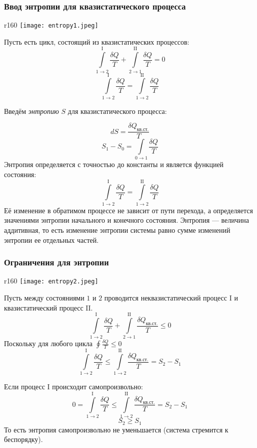 \documentclass[12pt, a4paper]{article}%
\begin{document}
\subsubsection*{Ввод энтропии для квазистатического процесса}


\begin{wrapfigure}[8]{r}{160}
\texttt{[image: entropy1.jpeg]}
\centering
\end{wrapfigure}

Пусть есть цикл, состоящий из квазистатических процессов:
\[\int\limits_{1\rightarrow2}^{\mathrm{I}}\frac{\delta Q}{T}+\int\limits_{2\rightarrow1}^{\mathrm{II}}\frac{\delta Q}{T}=0\]\[
\int\limits_{1\rightarrow2}^{\mathrm{I}}\frac{\delta Q}{T}=\int\limits_{1\rightarrow2}^{\mathrm{II}}\frac{\delta Q}{T}\]


Введём \textit{энтропию} $S$ для квазистатического процесса:



\[dS=\frac{\delta Q_{\text{кв.ст.}}}{T}\]\[ S_1-S_0=\int\limits_{0 \rightarrow 1}\frac{\delta Q}{T}\]Энтропия определяется с точностью до константы и является функцией состояния:
\[\int\limits_{1\rightarrow2}^{\mathrm{I}}\frac{\delta Q}{T}=\int\limits_{1\rightarrow2}^{\mathrm{II}}\frac{\delta Q}{T}\]Её изменение в обратимом процессе не зависит от пути перехода, а определяется значениями энтропии начального и конечного состояния.
Энтропия --- величина аддитивная, то есть изменение энтропии системы равно сумме изменений энтропии ее отдельных частей.

\subsubsection*{Ограничения для энтропии}

\begin{wrapfigure}[8]{r}{160}
\texttt{[image: entropy2.jpeg]}
\centering
\end{wrapfigure}



Пусть между состояниями $1$ и $2$ проводится неквазистатический процесс $\mathrm{I}$ и квазистатический процесс $\mathrm{II}$.
\[\int\limits_{1\rightarrow2}^{\mathrm{I}}\frac{\delta Q}{T}+\int\limits_{2\rightarrow1}^{\mathrm{II}}\frac{\delta Q_{\text{кв.ст.}}}{T}\le0\]Поскольку для любого цикла $\oint\frac{\delta Q}{T}\le0$
\[\int\limits_{1\rightarrow2}^{\mathrm{I}}\frac{\delta Q}{T}\le\int\limits_{1\rightarrow2}^{\mathrm{II}}\frac{\delta Q_{\text{кв.ст.}}}{T}=S_2-S_1\]


Если процесс $\mathrm{I}$ происходит самопроизвольно:
\[0=\int\limits_{1\rightarrow2}^{\mathrm{I}}\frac{\delta Q}{T}\le\int\limits_{1\rightarrow2}^{\mathrm{II}}\frac{\delta Q_{\text{кв.ст.}}}{T}=S_2-S_1\]\[
S_2\ge S_1\]То есть энтропия самопроизвольно не уменьшается (система стремится к беспорядку).
\end{document}

